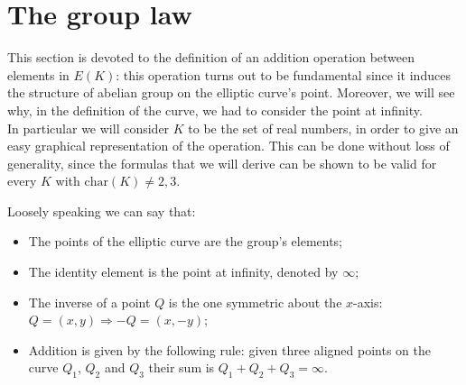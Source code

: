 \bigskip

\bigskip

\section{The group law}
\label{grouplaw}
This section is devoted to the definition of an addition operation between elements in $E(K)$: this operation turns out to be fundamental since it induces the structure of abelian group on the elliptic curve's point. Moreover, we will see why, in the definition of the curve, we had to consider the point at infinity.
\\
In particular we will consider $K$ to be the set of real numbers, in order to give an easy graphical representation of the operation. This can be done without loss of generality, since the formulas that we will derive can be shown to be valid for every $K$ with $\text{char}(K) \neq 2, 3$. 

\bigskip
\noindent
Loosely speaking we can say that:
\begin{itemize}
	\item The points of the elliptic curve are the group's elements;
	\item The identity element is the point at infinity, denoted by $\infty$;
	\item The inverse of a point $Q$ is the one symmetric about the $x$-axis: $Q = (x, y) \Longrightarrow -Q = (x, -y)$;
	\item Addition is given by the following rule: given three aligned points on the curve $Q_1$, $Q_2$ and $Q_3$ their sum is $Q_1 + Q_2 + Q_3 = \infty$.  
\end{itemize}

